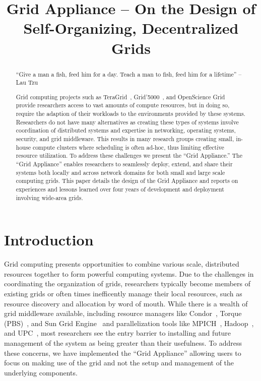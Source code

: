 \documentclass[conference]{IEEEtran}
\begin{document}
\title{Grid Appliance -- On the Design of Self-Organizing,
Decentralized Grids}

\author{
}

\maketitle


\begin{abstract}

``Give a man a fish, feed him for a day.  Teach a man to fish, feed him for a
lifetime'' -- Lau Tzu

Grid computing projects such as TeraGrid~\cite{teragrid},
Grid'5000~\cite{grid_5000}, and OpenScience Grid~\cite{osg} provide researchers
access to vast amounts of compute resources, but in doing so, require the
adaption of their workloads to the environments provided by these systems.
Researchers do not have many alternatives as creating these types of systems
involve coordination of distributed systems and expertise in networking,
operating systems, security, and grid middleware.  This results in many
research groups creating small, in-house compute clusters where scheduling is
often ad-hoc, thus limiting effective resource utilization.  To address these
challenges we present the ``Grid Appliance.''  The ``Grid Appliance'' enables
researchers to seamlessly deploy, extend, and share their systems both locally
and across network domains for both small and large scale computing grids.
This paper details the design of the Grid Appliance and reports on experiences
and lessons learned over four years of development and deployment involving
wide-area grids.

\end{abstract}

\section{Introduction}

Grid computing presents opportunities to combine various scale, distributed
resources together to form powerful computing systems.  Due to the challenges
in coordinating the organization of grids, researchers typically become members
of existing grids or often times inefficently manage their local resources,
such as resource discovery and allocation by word of mouth.  While there is a
wealth of grid middleware available, including resource managers like
Condor~\cite{condor0}, Torque (PBS)~\cite{torque}, and Sun Grid
Engine~\cite{grid_engine} and parallelization tools like MPICH~\cite{mpich},
Hadoop~\cite{hadoop}, and UPC~\cite{upc}, most researchers see the entry
barrier to installing and future management of the system as being greater than
their usefulness.  To address these concerns, we have implemented the ``Grid
Appliance'' allowing users to focus on making use of the grid and not the setup
and management of the underlying components.
\end{document}
